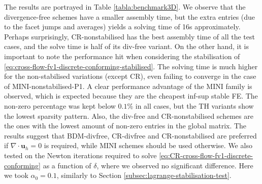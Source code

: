 \documentclass[onefignum,onetabnum,reqno,a4paper,final]{siamart250211}
\newcommand\bu{\boldsymbol{u}}
\newcommand\0{\mathbf{0}}
\numberwithin{figure}{section}
\numberwithin{table}{section}
\begin{document}
{The results are portrayed in Table \ref{tabla:benchmark3D}. We observe that the divergence-free schemes have a smaller assembly time, but the extra entries (due to the facet jumps and averages) yields a solving time of 16s approximately. Perhaps surprisingly,  CR-nonstabilised has the best assembly time of all the test cases, and the solve time is half of its div-free variant. On the other hand, it is important to note the performance hit when considering the stabilisation of \eqref{eq:cross-flow-fv1-discrete-conforming-stabilised}. The solving time is much higher for the non-stabilised variations (except CR), even failing to converge in the case of MINI-nonstabilised-P1. A clear performance advantage of the MINI family is observed, which is expected because they are the cheapest inf-sup stable FE. The non-zero percentage was kept below $0.1\%$ in all cases, but the TH variants show the lowest sparsity pattern. Also,  the div-free and CR-nonstabilised schemes are the ones with the lowest amount of non-zero entries in the global matrix. The results suggest that BDM-divfree, CR-divfree and CR-nonstabilised are preferred if $\nabla\cdot\bu_h=0$ is required, while MINI schemes should be used otherwise. We also tested on the Newton  iterations required to solve \eqref{eq:CR-cross-flow-fv1-discrete-conforming} as a function of $\delta$, where we observed no significant difference. Here we took $\alpha_0=0.1$, similarly to Section \ref{subsec:lagrange-stabilisation-test}.
 

}
\end{document}
